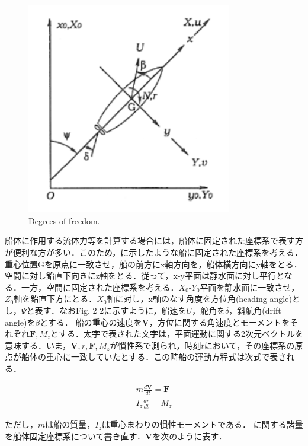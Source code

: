 \begin{figure}[htbp]
    \centering   
    \includegraphics[width=0.8\textwidth]{./img/2-2.png}
    \caption{Degrees of freedom.}
    \label{fig:2-2_png}
\end{figure}

船体に作用する流体力等を計算する場合には，船体に固定された座標系で表す方が便利な方が多い．このため，に示したような船に固定された座標系を考える．重心位置Gを原点に一致させ，船の前方にx軸方向を，船体横方向にy軸をとる．空間に対し鉛直下向きにz軸をとる．従って，x-y平面は静水面に対し平行となる．一方，空間に固定された座標系を考える．$X_0$-$Y_0$平面を静水面に一致させ，$Z_0$軸を鉛直下方にとる．$X_0$軸に対し，x軸のなす角度を方位角(heading angle)とし，$\Psi$と表す．なおFig. 2 2に示すように，船速を$U$，舵角を$\delta$，斜航角(drift angle)を$\beta$とする．
船の重心の速度を$\boldsymbol{V}$，方位に関する角速度とモーメントをそれぞれ$\boldsymbol{F},M_z$とする．太字で表された文字は，平面運動に関する2次元ベクトルを意味する．いま，$\boldsymbol{V},r,\boldsymbol{F},M_z$が慣性系で測られ，時刻$t$において，その座標系の原点が船体の重心に一致していたとする．この時船の運動方程式は次式で表される．

\begin{align}
    m \frac{d \boldsymbol{V}}{d t}=\boldsymbol{F} \label{eq:2-1} \\
    I_{z} \frac{d r}{d t}=M_{z} \label{eq:2-2}
\end{align}

ただし，$m$は船の質量，$I_z$は重心まわりの慣性モーメントである．
に関する諸量を船体固定座標系について書き直す．$\boldsymbol{V}$を次のように表す．

